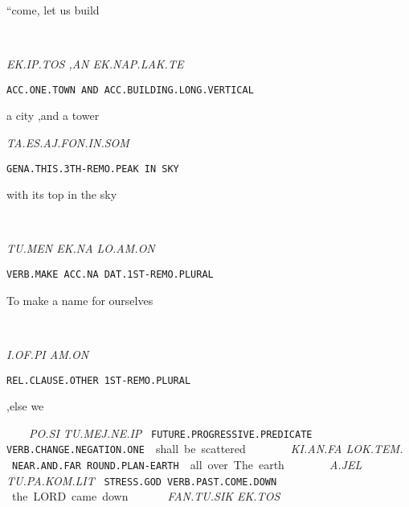 {“come, let us build                                                                          
\drie
 

\ek\ip\tos\comma~\an~\ek\nap\lak\te

{\it EK.IP.TOS		,AN	EK.NAP.LAK.TE	 }

{\tt ACC.ONE.TOWN		AND	ACC.BUILDING.LONG.VERTICAL }

a city			,and 	a tower	 
\drie

\ta\es\aj\fon\Atlanin\som

{\it TA.ES.AJ.FON.IN.SOM }

{\tt GENA.THIS.3TH-REMO.PEAK	IN	SKY }

with its top 				in           the sky 
\drie

  

\tu\men~	\ek\na~		\lo\am\on 

{\it TU.MEN	EK.NA		LO.AM.ON }

{\tt VERB.MAKE	ACC.NA		DAT.1ST-REMO.PLURAL	 }

To make 	a name 		for ourselves		 

\drie

 

\Atlani\of\Atlanpi ~ \am\on

{\it I.OF.PI			AM.ON }

{\tt REL.CLAUSE.OTHER	1ST-REMO.PLURAL }

,else 			we 

\drie
 

\po\si~\tu\mej\Atlanne\ip

{\it PO.SI			  TU.MEJ.NE.IP		 }

{\tt FUTURE.PROGRESSIVE.PREDICATE    VERB.CHANGE.NEGATION.ONE        }

shall be			    scattered			
\drie 


\ki\an\fa ~ \lok\tem\period

{\it KI.AN.FA		LOK.TEM. }

{\tt NEAR.AND.FAR		ROUND.PLAN-EARTH }

all over			The earth.
\drie 
 
\Atlana\jel ~ \tu\pa\kom\lit 

{\it A.JEL			TU.PA.KOM.LIT			 }

{\tt STRESS.GOD         VERB.PAST.COME.DOWN		}

the LORD 		came down 			

\drie 

\fan\tu\sik ~ \ek\tos

{\it FAN.TU.SIK		EK.TOS }

}
